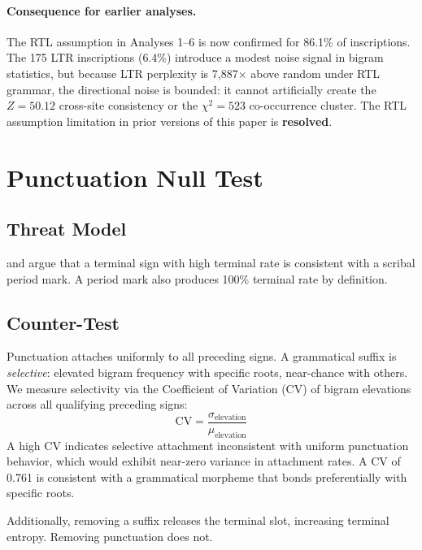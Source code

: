 \documentclass[12pt,letterpaper]{article}
\begin{document}
\paragraph{Consequence for earlier analyses.}
The RTL assumption in Analyses 1--6 is now confirmed for 86.1\% of
inscriptions.
The 175 LTR inscriptions (6.4\%) introduce a modest noise signal in
bigram statistics, but because LTR perplexity is 7,887$\times$ above
random under RTL grammar, the directional noise is bounded: it cannot
artificially create the $Z = 50.12$ cross-site consistency or the
$\chi^2 = 523$ co-occurrence cluster.
The RTL assumption limitation in prior versions of this paper is
\textbf{resolved}.

\section{Punctuation Null Test}
\label{sec:punct}

\subsection{Threat Model}

\citet{Farmer2004} and \citet{Sproat2014} argue that a terminal sign
with high terminal rate is consistent with a scribal period mark.
A period mark also produces 100\% terminal rate by definition.

\subsection{Counter-Test}

Punctuation attaches uniformly to all preceding signs.
A grammatical suffix is \emph{selective}: elevated bigram frequency
with specific roots, near-chance with others.
We measure selectivity via the Coefficient of Variation (CV) of
bigram elevations across all qualifying preceding signs:
\[
\mathrm{CV} = \frac{\sigma_{\mathrm{elevation}}}{\mu_{\mathrm{elevation}}}
\]
A high CV indicates selective attachment inconsistent with uniform punctuation
behavior, which would exhibit near-zero variance in attachment rates.
A CV of 0.761 is consistent with a grammatical morpheme that bonds
preferentially with specific roots.

Additionally, removing a suffix releases the terminal slot, increasing
terminal entropy.
Removing punctuation does not.
\end{document}
